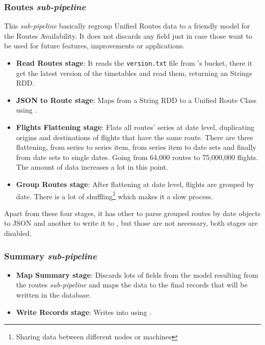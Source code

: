 \subsubsection*{Routes \textit{sub-pipeline}}

This \textit{sub-pipeline} basically regroup Unified Routes data to a friendly model for the Routes Availability. It does not discards any field just in case those want to be used for future features, improvements or applications.

\begin{itemize}
    \item \textbf{Read Routes stage}: It reads the \texttt{version.txt} file from \squad's bucket, there it get the latest version of the timetables and read them, returning an Strings RDD.
    \item \textbf{JSON to Route stage}: Maps from a String RDD to a Unified Route Class using .
    \item \textbf{Flights Flattening stage}: Flats all routes' series at date level, duplicating origins and destinations of flights that have the same route. There are three flattening, from series to series item, from series item to date sets and finally from date sets to single dates. Going from 64,000 routes to 75,000,000 flights. The amount of data increases a lot in this point.
    \item \textbf{Group Routes stage}: After flattening at date level, flights are grouped by date. There is a lot of shuffling\footnote{Sharing data between different nodes or machines} which makes it a slow process.
\end{itemize}

Apart from these four stages, it has other to parse grouped routes by date objects to JSON\cite{json} and another to write it to , but those are not necessary, both stages are disabled.

\subsubsection*{Summary \textit{sub-pipeline}}


\begin{itemize}
    \item \textbf{Map Summary stage}: Discards lots of fields from the model resulting from the routes \textit{sub-pipeline} and maps the data to the final records that will be written in the database.
    \item \textbf{Write Records stage}: Writes into  using .
\end{itemize}

